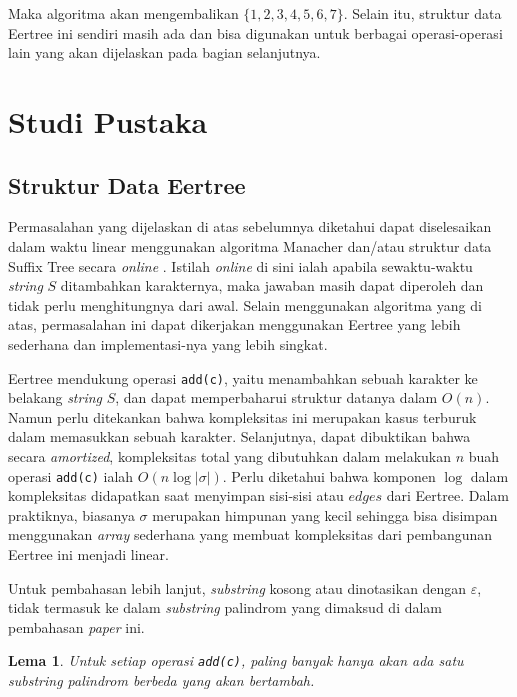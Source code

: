 \documentclass[11pt, a4paper, final]{article}
\newtheorem{lemma}[theorem]{Lema}
\begin{document}
Maka algoritma akan mengembalikan $\{1,2,3,4,5,6,7\}$. Selain itu, struktur data Eertree ini sendiri masih ada dan bisa digunakan untuk berbagai operasi-operasi lain yang akan dijelaskan pada bagian selanjutnya.

\section{Studi Pustaka}

\subsection{Struktur Data Eertree}

Permasalahan yang dijelaskan di atas sebelumnya diketahui dapat diselesaikan dalam waktu linear menggunakan algoritma Manacher dan/atau struktur data Suffix Tree secara \textit{online} \cite{RUBINCHIK2018249}. Istilah \textit{online} di sini ialah apabila sewaktu-waktu \textit{string} $S$ ditambahkan karakternya, maka jawaban masih dapat diperoleh dan tidak perlu menghitungnya dari awal. Selain menggunakan algoritma yang di atas, permasalahan ini dapat dikerjakan menggunakan Eertree yang lebih sederhana dan implementasi-nya yang lebih singkat.

Eertree mendukung operasi \texttt{add(c)}, yaitu menambahkan sebuah karakter ke belakang \textit{string} $S$, dan dapat memperbaharui struktur datanya dalam $O(n)$. Namun perlu ditekankan bahwa kompleksitas ini merupakan kasus terburuk dalam memasukkan sebuah karakter. Selanjutnya, dapat dibuktikan bahwa secara \textit{amortized}, kompleksitas total yang dibutuhkan dalam melakukan $n$ buah operasi \texttt{add(c)} ialah $O(n \log |\sigma|)$. Perlu diketahui bahwa komponen $\log$ dalam kompleksitas didapatkan saat menyimpan sisi-sisi atau $edges$ dari Eertree. Dalam praktiknya, biasanya $\sigma$ merupakan himpunan yang kecil sehingga bisa disimpan menggunakan \textit{array} sederhana yang membuat kompleksitas dari pembangunan Eertree ini menjadi linear.

Untuk pembahasan lebih lanjut, \textit{substring} kosong atau dinotasikan dengan $\varepsilon$, tidak termasuk ke dalam \textit{substring} palindrom yang dimaksud di dalam pembahasan \textit{paper} ini.

\begin{lemma}
Untuk setiap operasi \texttt{add(c)}, paling banyak hanya akan ada satu \textit{substring} palindrom berbeda yang akan bertambah.
\end{lemma}
\end{document}
